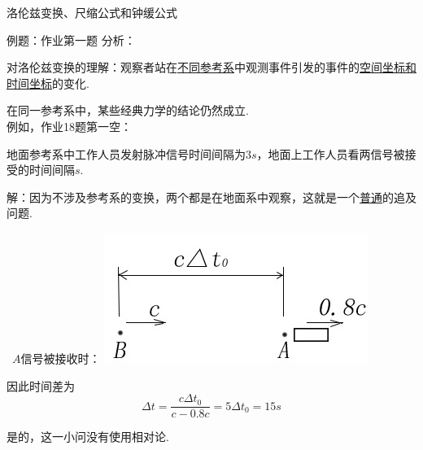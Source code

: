 \documentclass[a4paper,titlepage,onecolmn]{ctexart}
\begin{document}
\begin{section}{洛伦兹变换、尺缩公式和钟缓公式}
\begin{subsection}{例题：作业第一题}
分析：

对洛伦兹变换的理解：观察者站在\underline{不同参考系}中观测事件引发的事件的\underline{空间坐标和时间坐标}的变化.

在同一参考系中，某些经典力学的结论仍然成立.\\

例如，作业18题第一空：

地面参考系中工作人员发射脉冲信号时间间隔为$3s$，地面上工作人员看两信号被接受的时间间隔\underline{\hspace{2em}}$s$.

解：因为不涉及参考系的变换，两个都是在地面系中观察，这就是一个\underline{\underline{普通}}的追及问题.

\
$A$信号被接收时：\qquad
\includegraphics[scale=0.5]{Chp5_addin_illus (2).jpg}

因此时间差为
\begin{equation*}
\Delta t=\frac{c\Delta t_0}{c-0.8c}=5\Delta t_0=15s
\end{equation*}

是的，这一小问没有使用相对论.
\end{subsection}

\end{section}
\end{document}
